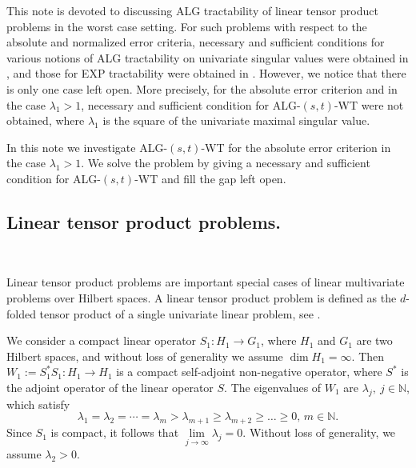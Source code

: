 \documentclass[10pt,a4paper]{amsart}
\numberwithin{equation}{section}
\def\lz{\lambda}
\newcommand{\NN}{\mathbb{N}}
\def\NN{{\mathbb N}}
\begin{document}
This note is devoted to discussing ALG tractability of linear
tensor product problems in the worst case setting. For such
problems with respect to the absolute and normalized error
criteria, necessary and sufficient conditions for various notions
of ALG tractability on univariate singular values were obtained in
\cite{NW08,  S13, GW11, SW15}, and  those for  EXP tractability
were obtained in \cite{HKW19, PP14, PPW17}. However, we notice
that there is only one case left open. More precisely, for the
absolute error criterion and in the case  $\lz_1>1$,  necessary
and sufficient condition for
 ALG-$(s,t)$-WT  were not obtained, where $\lz_1$ is  the square of the
 univariate maximal
singular value.




  In this note we investigate  ALG-$(s, t)$-WT   for the absolute error criterion in the case  $\lz_1>1$. We  solve the
problem by giving a necessary and sufficient condition for
 ALG-$(s,t)$-WT and fill  the  gap left open.











\subsection{Linear tensor product problems.}

\

Linear tensor product problems are
important special cases of linear multivariate problems over
Hilbert spaces. A linear tensor product problem is defined as the $d$-folded
tensor product of a single univariate linear problem, see
\cite[Chapter 5.2]{NW08}.

We consider a compact linear operator $S_1 : H_1\to G_1$, where
$H_1$ and $G_1$ are two Hilbert spaces, and without loss of
generality we assume $\dim H_1=\infty$. Then $W_1 := S_1^* S_1:
H_1 \to H_1$ is a compact self-adjoint non-negative operator,
where $S^*$ is the adjoint operator of the linear operator $S$.
The eigenvalues of $W_1$ are $\lz_j,\ j\in\NN$, which satisfy
$$\lambda_1=\lambda_2=\cdots=\lambda_m>\lambda_{m+1}\ge\lambda_{m+2}\ge\dots\ge0,\, m\in \NN .$$
Since $S_1$ is compact, it follows that
$\lim\limits_{j\to\infty}\lambda_j=0$. Without loss of generality,
we assume $\lz_2>0$.
\end{document}
